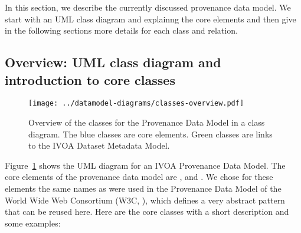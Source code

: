 In this section, we describe the currently discussed provenance data model. We 
start with an UML class diagram and explainng the core elements and then give 
in the following sections more details for each class and relation.

\subsection{Overview: UML class diagram and introduction to core classes}

\begin{figure}[h]
\centering
\texttt{[image: ../datamodel-diagrams/classes-overview.pdf]}
\caption{Overview of the classes for the Provenance Data Model in a class diagram. The blue classes are core elements.
Green classes are links to the IVOA Dataset Metadata Model.}
\label{fig:classdiagram}
\end{figure}



Figure~\ref{fig:classdiagram} shows the UML diagram for an IVOA Provenance Data
Model.
The core elements of the provenance data model are ,  and . 
We chose for these elements the same names as were used in the Provenance Data 
Model of the World Wide Web Consortium (W3C, \citealt{std:W3CProvDM}), which defines 
a very abstract pattern that can be reused here. Here are the core classes with 
a short description and some examples:


